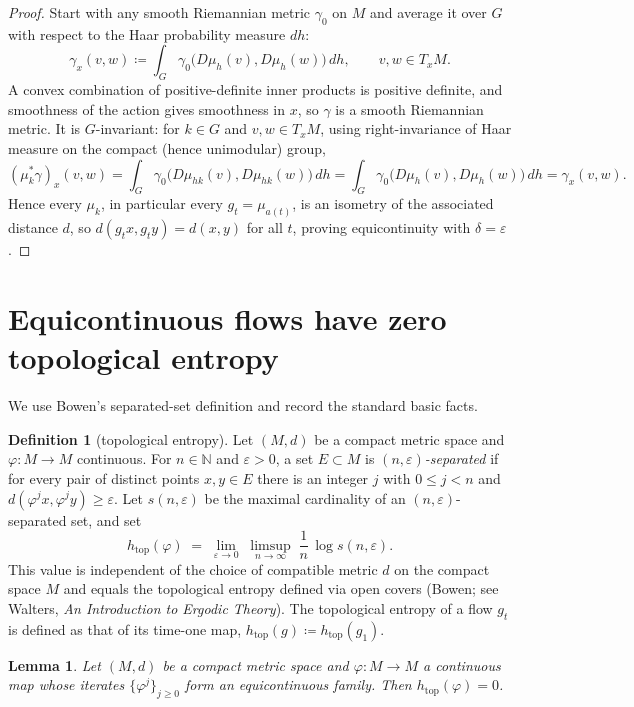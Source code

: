 \documentclass[11pt]{article}
\newtheorem{lemma}[theorem]{Lemma}
\theoremstyle{definition}
\newtheorem{definition}[theorem]{Definition}
\begin{document}
\begin{proof}
Start with any smooth Riemannian metric $\gamma_0$ on $M$ and average it
over $G$ with respect to the Haar probability measure $dh$:
\[
\gamma_x(v,w) \coloneqq \int_G
\gamma_0\big(D\mu_h(v), D\mu_h(w)\big)\, dh,
\qquad v, w \in T_x M .
\]
A convex combination of positive-definite inner products is positive
definite, and smoothness of the action gives smoothness in $x$, so
$\gamma$ is a smooth Riemannian metric. It is $G$-invariant: for
$k \in G$ and $v,w \in T_x M$, using right-invariance of Haar measure on
the compact (hence unimodular) group,
\[
(\mu_k^* \gamma)_x(v,w)
= \int_G \gamma_0\big(D\mu_{hk}(v), D\mu_{hk}(w)\big)\, dh
= \int_G \gamma_0\big(D\mu_{h}(v), D\mu_{h}(w)\big)\, dh
= \gamma_x(v,w) .
\]
Hence every $\mu_k$, in particular every $g_t = \mu_{a(t)}$, is an
isometry of the associated distance $d$, so
$d(g_t x, g_t y) = d(x,y)$ for all $t$, proving equicontinuity with
$\delta = \varepsilon$.
\end{proof}

\section{Equicontinuous flows have zero topological entropy}
\label{sec:entropy}

We use Bowen's separated-set definition and record the standard basic
facts.

\begin{definition}[topological entropy]\label{def:entropy}
Let $(M,d)$ be a compact metric space and $\varphi : M \to M$ continuous.
For $n \in \mathbb{N}$ and $\varepsilon > 0$, a set $E \subset M$ is
\emph{$(n,\varepsilon)$-separated} if for every pair of distinct points
$x, y \in E$ there is an integer $j$ with $0 \le j < n$ and
$d(\varphi^j x, \varphi^j y) \ge \varepsilon$. Let $s(n,\varepsilon)$ be
the maximal cardinality of an $(n,\varepsilon)$-separated set, and set
\[
h_{\mathrm{top}}(\varphi)
\;=\;
\lim_{\varepsilon \to 0}\;
\limsup_{n \to \infty}\;
\frac{1}{n}\, \log s(n,\varepsilon) .
\]
This value is independent of the choice of compatible metric $d$ on the
compact space $M$ and equals the topological entropy defined via open
covers (Bowen; see Walters, \emph{An Introduction to Ergodic Theory}).
The topological entropy of a flow $g_t$ is defined as that of its
time-one map, $h_{\mathrm{top}}(g) \coloneqq h_{\mathrm{top}}(g_1)$.
\end{definition}

\begin{lemma}\label{lem:zero}
Let $(M,d)$ be a compact metric space and $\varphi : M \to M$ a continuous
map whose iterates $\{\varphi^j\}_{j \ge 0}$ form an equicontinuous
family. Then $h_{\mathrm{top}}(\varphi) = 0$.
\end{lemma}
\end{document}
